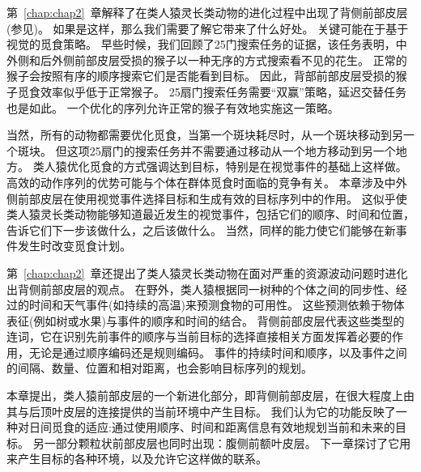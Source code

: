 第~\ref{chap:chap2}~章解释了在类人猿灵长类动物的进化过程中出现了背侧前部皮层(参见\cite{preuss2011human})。
如果是这样，那么我们需要了解它带来了什么好处。
关键可能在于基于视觉的觅食策略。
早些时候，我们回顾了25门搜索任务的证据，该任务表明，中外侧和后外侧前部皮层受损的猴子以一种无序的方式搜索看不见的花生\cite{passingham1985memory}。
正常的猴子会按照有序的顺序搜索它们是否能看到目标\cite{desrochers2010optimal,taffe2011rhesus}。
因此，背部前部皮层受损的猴子觅食效率似乎低于正常猴子。
25扇门搜索任务需要“双赢”策略，延迟交替任务也是如此。
一个优化的序列允许正常的猴子有效地实施这一策略。


当然，所有的动物都需要优化觅食，当第一个斑块耗尽时，从一个斑块移动到另一个斑块\cite{plank2008optimal}。
但这项25扇门的搜索任务并不需要通过移动从一个地方移动到另一个地方。
类人猿优化觅食的方式强调达到目标，特别是在视觉事件的基础上这样做。
高效的动作序列的优势可能与个体在群体觅食时面临的竞争有关。
本章涉及中外侧前部皮层在使用视觉事件选择目标和生成有效的目标序列中的作用。
这似乎使类人猿灵长类动物能够知道最近发生的视觉事件，包括它们的顺序、时间和位置，告诉它们下一步该做什么，之后该做什么。
当然，同样的能力使它们能够在新事件发生时改变觅食计划。


第~\ref{chap:chap2}~章还提出了类人猿灵长类动物在面对严重的资源波动问题时进化出背侧前部皮层的观点。
在野外，类人猿根据同一树种的个体之间的同步性、经过的时间和天气事件(如持续的高温)来预测食物的可用性。
这些预测依赖于物体表征(例如树或水果)与事件的顺序和时间的结合。
背侧前部皮层代表这些类型的连词，它在识别先前事件的顺序与当前目标的选择直接相关方面发挥着必要的作用，无论是通过顺序编码还是规则编码。
事件的持续时间和顺序，以及事件之间的间隔、数量、位置和相对距离，也会影响目标序列的规划。


本章提出，类人猿前部皮层的一个新进化部分，即背侧前部皮层，在很大程度上由其与后顶叶皮层的连接提供的当前环境中产生目标。
我们认为它的功能反映了一种对日间觅食的适应:通过使用顺序、时间和距离信息有效地规划当前和未来的目标。
另一部分颗粒状前部皮层也同时出现：腹侧前额叶皮层。
下一章探讨了它用来产生目标的各种环境，以及允许它这样做的联系。

